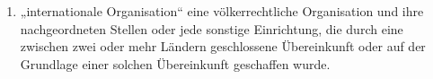 \begin{enumerate}
  \item „internationale Organisation“ eine völkerrechtliche Organisation und ihre nachgeordneten Stellen oder jede
   sonstige Einrichtung, die durch eine zwischen zwei oder mehr Ländern geschlossene Übereinkunft oder auf der
   Grundlage einer solchen Übereinkunft geschaffen wurde.%
  \label{itm:04-26}

\end{enumerate}

